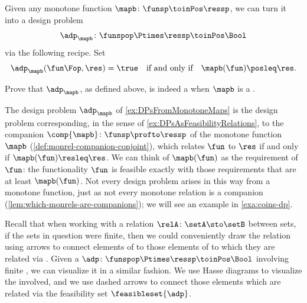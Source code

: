 \begin{gradedexercise}
    \label{ex:DPsFromMonotoneMaps}

    Given any monotone function $\mapb\colon \funsp \toinPos \ressp$, we can turn it into a design problem
    \begin{equation*}
        \adp_\mapb \colon \funspop \Ptimes \ressp \toinPos \Bool
    \end{equation*}
    via the following recipe.
    Set
    \begin{equation*}
        \adp_\mapb (\fun\Fop, \res) = \true \quad \text{if and only if} \quad \mapb(\fun) \posleq \res.
    \end{equation*}

    Prove that $\adp_\mapb$, as defined above, is indeed a  when $\mapb$ is a .
\end{gradedexercise}


The design problem $\adp_\mapb$ of \cref{ex:DPsFromMonotoneMaps} is the design problem corresponding, in the sense of \cref{ex:DPsAsFeasibilityRelations}, to the companion $\comp{\mapb} \colon \funsp \profto \ressp$ of the monotone function $\mapb$ (\cref{def:monrel-companion-conjoint}), which relates $\fun$ to $\res$ if and only if $\mapb(\fun) \resleq \res$.
We can think of $\mapb(\fun)$ as the requirement of $\fun$: the functionality $\fun$ is feasible exactly with those requirements that are at least $\mapb(\fun)$.
Not every design problem arises in this way from a monotone function, just as not every monotone relation is a companion (\cref{lem:which-monrels-are-companions}); we will see an example in \cref{exa:coins-dp}.


Recall that when working with a relation $\relA \colon \setA \sto \setB$ between sets, if the sets in question were finite, then we could conveniently draw the relation \relA using arrows to connect elements of \setA to those elements of \setB to which they are related via \relA.
Given a  $\adp \colon \funspop \Ptimes \ressp\toinPos \Bool$ involving finite , we can visualize it in a similar fashion.
We use Hasse diagrams to visualize the  involved, and we use dashed arrows to connect those elements which are related via the feasibility set $\feasibleset{\adp}$.

\begin{marginfigure}
    \centering
    \caption{}
    \label{fig:example_dp_graph_xy}
\end{marginfigure}
\begin{marginfigure}
    \centering
    \caption{}
    \label{fig:example_dp_graph_xy_feas}
\end{marginfigure}

